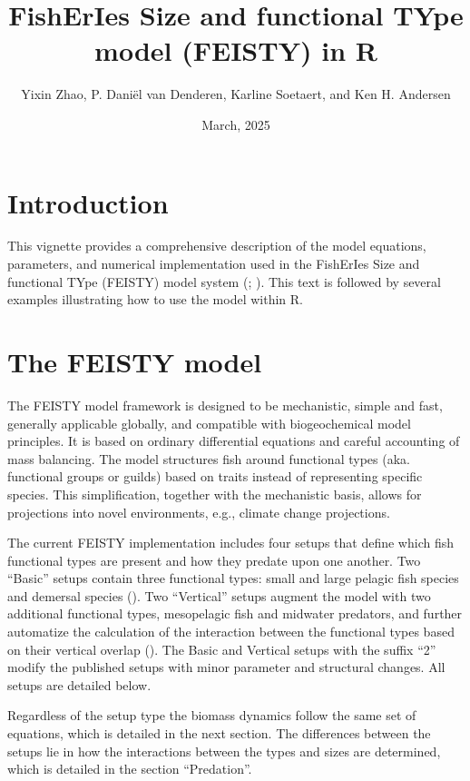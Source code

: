 \documentclass[
]{article}
\title{FishErIes Size and functional TYpe model (FEISTY) in R}
\author{Yixin Zhao, P. Daniël van Denderen, Karline Soetaert, and Ken H.
Andersen}
\date{March, 2025}
\begin{document}
\maketitle

\section{Introduction}\label{introduction}

This vignette provides a comprehensive description of the model
equations, parameters, and numerical implementation used in the
FishErIes Size and functional TYpe (FEISTY) model system
(;
). This text is
followed by several examples illustrating how to use the model within R.

\section{The FEISTY model}\label{the-feisty-model}

The FEISTY model framework is designed to be mechanistic, simple and
fast, generally applicable globally, and compatible with biogeochemical
model principles. It is based on ordinary differential equations and
careful accounting of mass balancing. The model structures fish around
functional types (aka. functional groups or guilds) based on traits
instead of representing specific species. This simplification, together
with the mechanistic basis, allows for projections into novel
environments, e.g., climate change projections.

The current FEISTY implementation includes four setups that define which
fish functional types are present and how they predate upon one another.
Two ``Basic'' setups contain three functional types: small and large
pelagic fish species and demersal species
(). Two ``Vertical''
setups augment the model with two additional functional types,
mesopelagic fish and midwater predators, and further automatize the
calculation of the interaction between the functional types based on
their vertical overlap (). The Basic and Vertical setups with the suffix ``2'' modify the
published setups with minor parameter and structural changes. All setups
are detailed below.

Regardless of the setup type the biomass dynamics follow the same set of
equations, which is detailed in the next section. The differences
between the setups lie in how the interactions between the types and
sizes are determined, which is detailed in the section ``Predation''.
\end{document}
